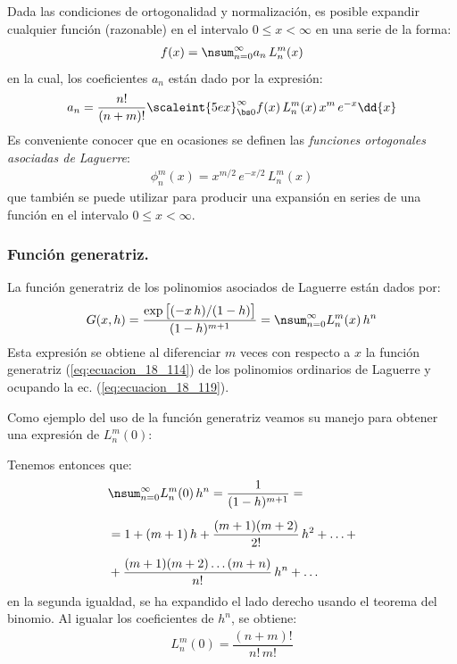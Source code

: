 Dada las condiciones de ortogonalidad y normalización, es posible expandir cualquier función (razonable) en el intervalo $0 \leq x < \infty$ en una serie de la forma:
\begin{align*}
f(x) = \nsum_{n=0}^{\infty} a_{n} \, L_{n}^{m} (x)
\end{align*}
en la cual, los coeficientes $a_{n}$ están dado por la expresión:
\begin{align*}
a_{n} = \dfrac{n!}{(n + m)!} \scaleint{5ex}_{\bs 0}^{\infty} f(x) \, L_{n}^{m}(x) \, x^{m} \, e^{-x} \dd{x}
\end{align*}
Es conveniente conocer que en ocasiones se definen las \emph{funciones ortogonales asociadas de Laguerre}:
\begin{align*}
\phi_{n}^{m} (x) = x^{m/2} \, e^{-x/2} \, L_{n}^{m} (x)
\end{align*}
que también se puede utilizar para producir una expansión en series de una función en el intervalo $0 \leq x < \infty$.

\subsubsection{Función generatriz.}

La función generatriz de los polinomios asociados de Laguerre están dados por:
\begin{align}
G(x, h) = \dfrac{\exp\big[(-x \, h)/(1 - h)\big]}{(1 - h)^{m+1}} = \nsum_{n=0}^{\infty} L_{n}^{m} (x) \, h^{n}
\label{eq:ecuacion_18_123}
\end{align}
Esta expresión se obtiene al diferenciar $m$ veces con respecto a $x$ la función generatriz (\ref{eq:ecuacion_18_114}) de los polinomios ordinarios de Laguerre y ocupando la ec. (\ref{eq:ecuacion_18_119}).
\par
Como ejemplo del uso de la función generatriz veamos su manejo para obtener una expresión de $L_{n}^{m}(0)$:
\par
Tenemos entonces que:
\begin{align*}
&\nsum_{n=0}^{\infty} L_{n}^{m} (0) \, h^{n} = \dfrac{1}{(1 - h)^{m+1}} = \\[0.5em]
&= 1 + (m + 1) \, h + \dfrac{(m + 1)(m + 2)}{2!} \, h^{2} + \ldots + \\[0.5em]
&+ \dfrac{(m + 1)(m + 2) \ldots (m + n)}{n!} \, h^{n} + \ldots  
\end{align*}
en la segunda igualdad, se ha expandido el lado derecho usando el teorema del binomio. Al igualar los coeficientes de $h^{n}$, se obtiene:
\begin{align*}
L_{n}^{m} (0) = \dfrac{(n + m)!}{n! \, m!}
\end{align*}

